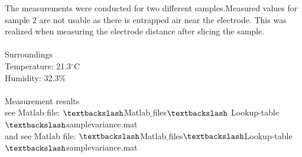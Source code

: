 The measurements were conducted for two different samples.Measured values for sample 2 are not usable as there is entrapped air near the electrode. This was realized when measuring the electrode distance after slicing the sample.\\
\\
{\Large Surroundings}
\\
Temperature: 21.3$^{\circ}$C\\
Humidity: 32.3\% \\
\\
{\Large Measurement results}\\
see Matlab file: $\textbackslash$Matlab$\_$files$\textbackslash$ Lookup-table$\textbackslash$samplevariance.mat\\
and see Matlab file: $\textbackslash$Matlab$\_$files$\textbackslash$Lookup-table$\textbackslash$samplevariance.mat

